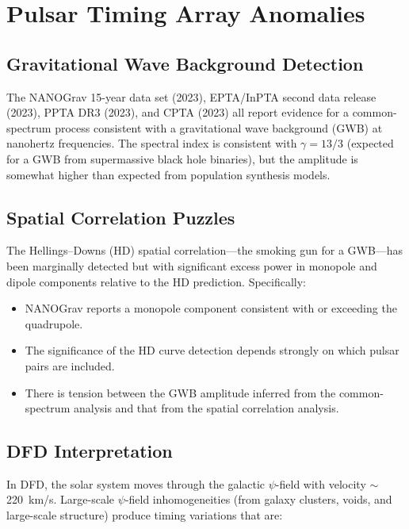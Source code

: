 \documentclass[12pt,letterpaper]{article}
\begin{document}
\section{Pulsar Timing Array Anomalies}

\subsection{Gravitational Wave Background Detection}

The NANOGrav 15-year data set (2023), EPTA/InPTA second data release (2023),
PPTA DR3 (2023), and CPTA (2023) all report evidence for a common-spectrum
process consistent with a gravitational wave background (GWB) at
nanohertz frequencies. The spectral index is consistent with
$\gamma = 13/3$ (expected for a GWB from supermassive black hole binaries),
but the amplitude is somewhat higher than expected from population
synthesis models.

\subsection{Spatial Correlation Puzzles}

The Hellings--Downs (HD) spatial correlation---the smoking gun for
a GWB---has been marginally detected but with significant excess power
in monopole and dipole components relative to the HD prediction.
Specifically:

\begin{itemize}
\item NANOGrav reports a monopole component consistent with or exceeding
the quadrupole.
\item The significance of the HD curve detection depends strongly on
which pulsar pairs are included.
\item There is tension between the GWB amplitude inferred from the
common-spectrum analysis and that from the spatial correlation analysis.
\end{itemize}

\subsection{DFD Interpretation}

In DFD, the solar system moves through the galactic $\psi$-field with
velocity $\sim$220~km/s. Large-scale $\psi$-field inhomogeneities (from
galaxy clusters, voids, and large-scale structure) produce timing
variations that are:
\end{document}
